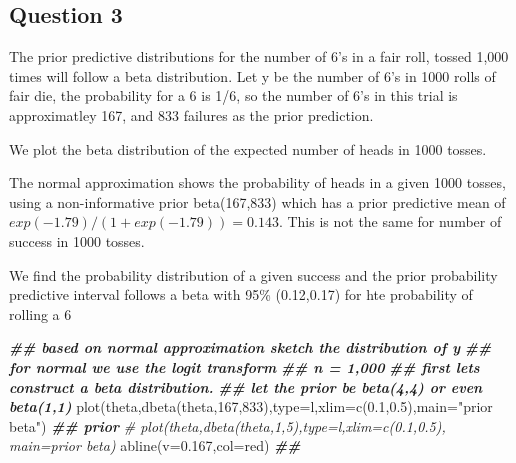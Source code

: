 \documentclass[
]{book}
\newenvironment{Shaded}{\begin{snugshade}}{\end{snugshade}}
\newcommand{\AttributeTok}[1]{\textcolor[rgb]{0.77,0.63,0.00}{#1}}
\newcommand{\CommentTok}[1]{\textcolor[rgb]{0.56,0.35,0.01}{\textit{#1}}}
\newcommand{\DecValTok}[1]{\textcolor[rgb]{0.00,0.00,0.81}{#1}}
\newcommand{\DocumentationTok}[1]{\textcolor[rgb]{0.56,0.35,0.01}{\textbf{\textit{#1}}}}
\newcommand{\FloatTok}[1]{\textcolor[rgb]{0.00,0.00,0.81}{#1}}
\newcommand{\FunctionTok}[1]{\textcolor[rgb]{0.00,0.00,0.00}{#1}}
\newcommand{\NormalTok}[1]{#1}
\newcommand{\StringTok}[1]{\textcolor[rgb]{0.31,0.60,0.02}{#1}}
\theoremstyle{definition}
\theoremstyle{definition}
\theoremstyle{definition}
\theoremstyle{definition}
\theoremstyle{remark}
\begin{document}
\hypertarget{question-3}{%
\subsection*{Question 3}\label{question-3}}

The prior predictive distributions for the number of 6's in a fair roll, tossed 1,000 times will follow a beta distribution. Let y be the number of 6's in 1000 rolls of fair die, the probability for a 6 is 1/6, so the number of 6's in this trial is approximatley 167, and 833 failures as the prior prediction.

We plot the beta distribution of the expected number of heads in 1000 tosses.

The normal approximation shows the probability of heads in a given 1000 tosses, using a non-informative prior beta(167,833) which has a prior predictive mean of \(exp(-1.79)/(1+exp(-1.79)) = 0.143\). This is not the same for number of success in 1000 tosses.

We find the probability distribution of a given success and the prior probability predictive interval follows a beta with 95\% (0.12,0.17) for hte probability of rolling a 6

\begin{Shaded}
\begin{Highlighting}[]
  \DocumentationTok{\#\# based on normal approximation sketch the distribution of y}
  \DocumentationTok{\#\# for normal we use the logit transform}
  \DocumentationTok{\#\# n = 1,000}
  \DocumentationTok{\#\# first lets construct a beta distribution.}
  \DocumentationTok{\#\# let the prior be beta(4,4) or even beta(1,1)}
   \FunctionTok{plot}\NormalTok{(theta,}\FunctionTok{dbeta}\NormalTok{(theta,}\DecValTok{167}\NormalTok{,}\DecValTok{833}\NormalTok{),}\AttributeTok{type=}\StringTok{\textquotesingle{}l\textquotesingle{}}\NormalTok{,}\AttributeTok{xlim=}\FunctionTok{c}\NormalTok{(}\FloatTok{0.1}\NormalTok{,}\FloatTok{0.5}\NormalTok{),}\AttributeTok{main=}\StringTok{"prior beta"}\NormalTok{) }\DocumentationTok{\#\# prior}
  \CommentTok{\# plot(theta,dbeta(theta,1,5),type=\textquotesingle{}l\textquotesingle{},xlim=c(0.1,0.5), main=\textquotesingle{}prior beta\textquotesingle{}) }
   \FunctionTok{abline}\NormalTok{(}\AttributeTok{v=}\FloatTok{0.167}\NormalTok{,}\AttributeTok{col=}\StringTok{\textquotesingle{}red\textquotesingle{}}\NormalTok{) }\DocumentationTok{\#\# }
\end{Highlighting}
\end{Shaded}
\end{document}
